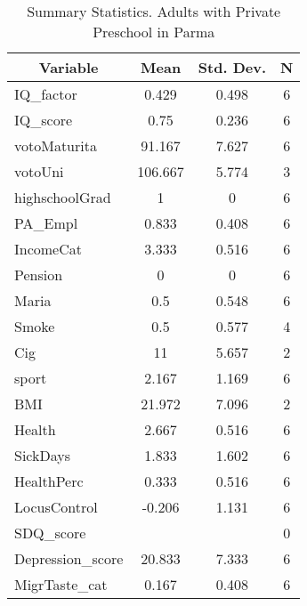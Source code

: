 
\begin{table}[htbp]\centering \caption{Summary Statistics. Adults with Private Preschool in Parma \label{bothAdultmaternaPrivParma}}
\begin{tabular}{l c c  c}\hline\hline
\multicolumn{1}{c}{\textbf{Variable}} & \textbf{Mean}
 & \textbf{Std. Dev.} & \textbf{N}\\ \hline
IQ\_factor & 0.429 & 0.498  & 6\\
IQ\_score & 0.75 & 0.236  & 6\\
votoMaturita & 91.167 & 7.627  & 6\\
votoUni & 106.667 & 5.774  & 3\\
highschoolGrad & 1 & 0  & 6\\
PA\_Empl & 0.833 & 0.408  & 6\\
IncomeCat & 3.333 & 0.516  & 6\\
Pension & 0 & 0  & 6\\
Maria & 0.5 & 0.548  & 6\\
Smoke & 0.5 & 0.577  & 4\\
Cig & 11 & 5.657  & 2\\
sport & 2.167 & 1.169  & 6\\
BMI & 21.972 & 7.096  & 2\\
Health & 2.667 & 0.516  & 6\\
SickDays & 1.833 & 1.602  & 6\\
HealthPerc & 0.333 & 0.516  & 6\\
LocusControl & -0.206 & 1.131  & 6\\
SDQ\_score &  &   & 0\\
Depression\_score & 20.833 & 7.333  & 6\\
MigrTaste\_cat & 0.167 & 0.408  & 6\\
\hline\end{tabular}
\end{table}
